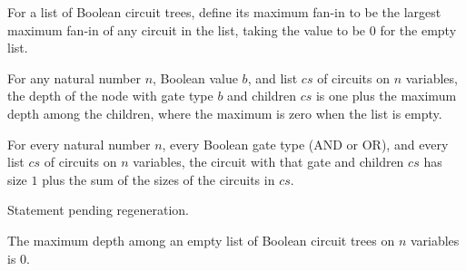 \begin{definition}
\label{BoolCircuit.TreeCircuit.maxFaninL}
\leanok
{}
For a list of Boolean circuit trees, define its maximum fan-in to be the largest maximum
fan-in of any circuit in the list, taking the value to be $0$ for the empty list.
\end{definition}

\begin{theorem}
\label{BoolCircuit.TreeCircuit.depth_node}
\leanok
{}
For any natural number $n$, Boolean value $b$, and list $cs$ of circuits on $n$
variables, the depth of the node with gate type $b$ and children $cs$ is one plus the
maximum depth among the children, where the maximum is zero when the list is empty.
\end{theorem}

\begin{theorem}
\label{BoolCircuit.TreeCircuit.size_node}
\leanok
{}
For every natural number $n$, every Boolean gate type (AND or OR), and every list $cs$
of circuits on $n$ variables, the circuit with that gate and children $cs$ has size $1$
plus the sum of the sizes of the circuits in $cs$.
\end{theorem}

\begin{theorem}
\label{BoolCircuit.TreeCircuit.maxFanin_node}
\leanok
{}
Statement pending regeneration.
\end{theorem}

\begin{theorem}
\label{BoolCircuit.TreeCircuit.maxDepth_nil}
\leanok
{}
The maximum depth among an empty list of Boolean circuit trees on $n$ variables is $0$.
\end{theorem}

